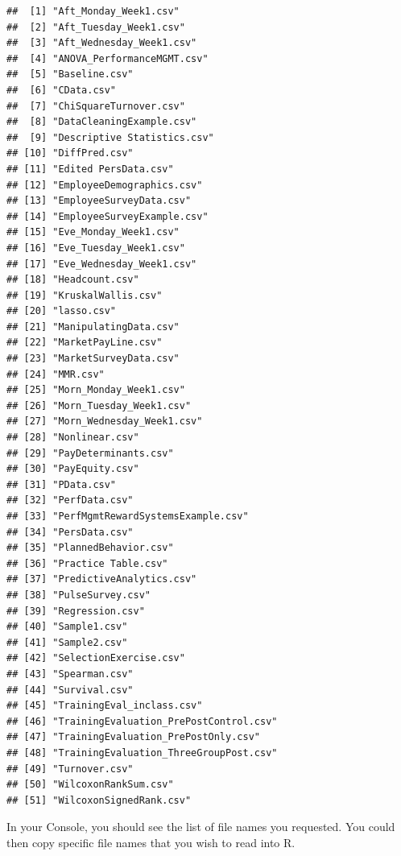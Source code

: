 \documentclass[]{book}
\begin{document}
\begin{verbatim}
##  [1] "Aft_Monday_Week1.csv"                 
##  [2] "Aft_Tuesday_Week1.csv"                
##  [3] "Aft_Wednesday_Week1.csv"              
##  [4] "ANOVA_PerformanceMGMT.csv"            
##  [5] "Baseline.csv"                         
##  [6] "CData.csv"                            
##  [7] "ChiSquareTurnover.csv"                
##  [8] "DataCleaningExample.csv"              
##  [9] "Descriptive Statistics.csv"           
## [10] "DiffPred.csv"                         
## [11] "Edited PersData.csv"                  
## [12] "EmployeeDemographics.csv"             
## [13] "EmployeeSurveyData.csv"               
## [14] "EmployeeSurveyExample.csv"            
## [15] "Eve_Monday_Week1.csv"                 
## [16] "Eve_Tuesday_Week1.csv"                
## [17] "Eve_Wednesday_Week1.csv"              
## [18] "Headcount.csv"                        
## [19] "KruskalWallis.csv"                    
## [20] "lasso.csv"                            
## [21] "ManipulatingData.csv"                 
## [22] "MarketPayLine.csv"                    
## [23] "MarketSurveyData.csv"                 
## [24] "MMR.csv"                              
## [25] "Morn_Monday_Week1.csv"                
## [26] "Morn_Tuesday_Week1.csv"               
## [27] "Morn_Wednesday_Week1.csv"             
## [28] "Nonlinear.csv"                        
## [29] "PayDeterminants.csv"                  
## [30] "PayEquity.csv"                        
## [31] "PData.csv"                            
## [32] "PerfData.csv"                         
## [33] "PerfMgmtRewardSystemsExample.csv"     
## [34] "PersData.csv"                         
## [35] "PlannedBehavior.csv"                  
## [36] "Practice Table.csv"                   
## [37] "PredictiveAnalytics.csv"              
## [38] "PulseSurvey.csv"                      
## [39] "Regression.csv"                       
## [40] "Sample1.csv"                          
## [41] "Sample2.csv"                          
## [42] "SelectionExercise.csv"                
## [43] "Spearman.csv"                         
## [44] "Survival.csv"                         
## [45] "TrainingEval_inclass.csv"             
## [46] "TrainingEvaluation_PrePostControl.csv"
## [47] "TrainingEvaluation_PrePostOnly.csv"   
## [48] "TrainingEvaluation_ThreeGroupPost.csv"
## [49] "Turnover.csv"                         
## [50] "WilcoxonRankSum.csv"                  
## [51] "WilcoxonSignedRank.csv"
\end{verbatim}

In your Console, you should see the list of file names you requested.
You could then copy specific file names that you wish to read into R.
\end{document}
